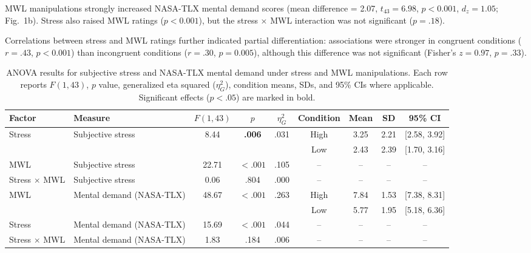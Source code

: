 \documentclass[lettersize,journal]{IEEEtran}
\begin{document}
MWL manipulations strongly increased NASA-TLX mental demand scores (mean difference = 2.07, $t_{43}=6.98$, $p < 0.001$, $d_z = 1.05$; Fig.~1b). Stress also raised MWL ratings ($p < 0.001$), but the stress × MWL interaction was not significant ($p = .18$). 

Correlations between stress and MWL ratings further indicated partial differentiation: associations were stronger in congruent conditions ($r = .43$, $p < 0.001$) than incongruent conditions ($r = .30$, $p = 0.005$), although this difference was not significant (Fisher’s $z = 0.97$, $p = .33$).

\begin{table}[!t]
\centering
\caption{ANOVA results for subjective stress and NASA-TLX mental demand under stress and MWL manipulations. Each row reports $F(1,43)$, $p$ value, generalized eta squared ($\eta^2_G$), condition means, SDs, and 95\% CIs where applicable. Significant effects ($p < .05$) are marked in bold.}
\label{tab:anova_results}
\begin{tabular}{llccccccc}
\toprule
Factor & Measure & $F(1,43)$ & $p$ & $\eta^2_G$ & Condition & Mean & SD & 95\% CI \\
\midrule
\multirow{2}{*}{Stress} & \multirow{2}{*}{Subjective stress}
& 8.44 & \textbf{.006} & .031 & High & 3.25 & 2.21 & [2.58, 3.92] \\
& & & & & Low & 2.43 & 2.39 & [1.70, 3.16] \\
MWL & Subjective stress
& 22.71 & \textbf{$<.001$} & .105 & -- & -- & -- & -- \\
Stress $\times$ MWL & Subjective stress
& 0.06 & .804 & .000 & -- & -- & -- & -- \\
\midrule
MWL & \multirow{2}{*}{Mental demand (NASA-TLX)}
& 48.67 & \textbf{$<.001$} & .263 & High & 7.84 & 1.53 & [7.38, 8.31] \\
& & & & & Low & 5.77 & 1.95 & [5.18, 6.36] \\
Stress & Mental demand (NASA-TLX)
& 15.69 & \textbf{$<.001$} & .044 & -- & -- & -- & -- \\
Stress $\times$ MWL & Mental demand (NASA-TLX)
& 1.83 & .184 & .006 & -- & -- & -- & -- \\
\bottomrule
\end{tabular}
\end{table}
\end{document}
